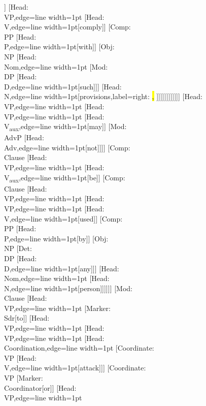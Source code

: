 \documentclass[tikz,border=12pt]{standalone}
\newcommand{\p}[1]{%
    \sethlcolor{white}\color{gray}\hl{#1}%
}
\newcommand{\Node}[2]{\small\textsf{#1:}\\{#2}}
\begin{document}
\begin{forest}
                            [\Node{Marker}{Sdr}[to]]
                            [\Node{Head}{VP},edge={line width=1pt}
                                [\Node{Head}{V},edge={line width=1pt}[comply]]
                                [\Node{Comp}{PP}
                                    [\Node{Head}{P},edge={line width=1pt}[with]]
                                    [\Node{Obj}{NP}
                                        [\Node{Head}{Nom},edge={line width=1pt}
                                            [\Node{Mod}{DP}
                                                [\Node{Head}{D},edge={line width=1pt}[such]]]
                                            [\Node{Head}{N},edge={line width=1pt}[provisions,label={right:\p{{,}}}]]]]]]]]]]]]
    [\Node{Head}{VP},edge={line width=1pt}
        [\Node{Head}{VP},edge={line width=1pt}
            [\Node{Head}{V\textsubscript{aux}},edge={line width=1pt}[may]]
            [\Node{Mod}{AdvP}
                [\Node{Head}{Adv},edge={line width=1pt}[not]]]]
        [\Node{Comp}{Clause}
            [\Node{Head}{VP},edge={line width=1pt}
                [\Node{Head}{V\textsubscript{aux}},edge={line width=1pt}[be]]
                [\Node{Comp}{Clause}
                    [\Node{Head}{VP},edge={line width=1pt}
                        [\Node{Head}{VP},edge={line width=1pt}
                            [\Node{Head}{V},edge={line width=1pt}[used]]
                            [\Node{Comp}{PP}
                                [\Node{Head}{P},edge={line width=1pt}[by]]
                                [\Node{Obj}{NP}
                                    [\Node{Det}{DP}
                                        [\Node{Head}{D},edge={line width=1pt}[any]]]
                                    [\Node{Head}{Nom},edge={line width=1pt}
                                        [\Node{Head}{N},edge={line width=1pt}[person]]]]]]
                        [\Node{Mod}{Clause}
                            [\Node{Head}{VP},edge={line width=1pt}
                                [\Node{Marker}{Sdr}[to]]
                                [\Node{Head}{VP},edge={line width=1pt}
                                    [\Node{Head}{VP},edge={line width=1pt}
                                        [\Node{Head}{Coordination},edge={line width=1pt}
                                            [\Node{Coordinate}{VP}
                                                [\Node{Head}{V},edge={line width=1pt}[attack]]]
                                            [\Node{Coordinate}{VP}
                                                [\Node{Marker}{Coordinator}[or]]
                                                [\Node{Head}{VP},edge={line width=1pt}

\end{forest}
\end{document}
